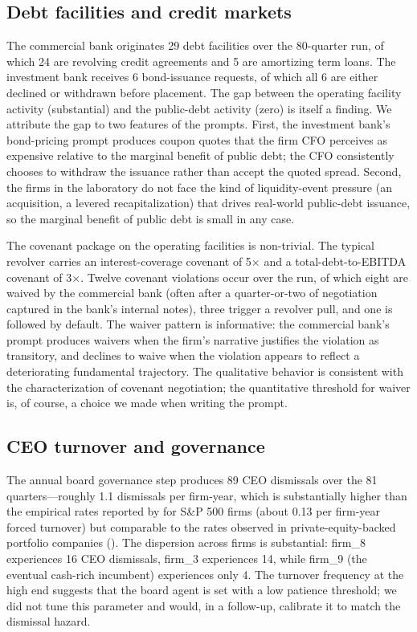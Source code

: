 \documentclass[11pt]{article}
\begin{document}
\subsection{Debt facilities and credit markets}

The commercial bank originates 29 debt facilities over the 80-quarter
run, of which 24 are revolving credit agreements and 5 are amortizing
term loans. The investment bank receives 6 bond-issuance requests, of
which all 6 are either declined or withdrawn before placement. The
gap between the operating facility activity (substantial) and the
public-debt activity (zero) is itself a finding. We attribute the
gap to two features of the prompts. First, the investment bank's
bond-pricing prompt produces coupon quotes that the firm CFO
perceives as expensive relative to the marginal benefit of public
debt; the CFO consistently chooses to withdraw the issuance rather
than accept the quoted spread. Second, the firms in the laboratory
do not face the kind of liquidity-event pressure (an acquisition, a
levered recapitalization) that drives real-world public-debt issuance,
so the marginal benefit of public debt is small in any case.

The covenant package on the operating facilities is non-trivial. The
typical revolver carries an interest-coverage covenant of 5$\times$
and a total-debt-to-EBITDA covenant of 3$\times$. Twelve covenant
violations occur over the run, of which eight are waived by the
commercial bank (often after a quarter-or-two of negotiation
captured in the bank's internal notes), three trigger a
revolver pull, and one is followed by default. The waiver pattern
is informative: the commercial bank's prompt produces waivers when
the firm's narrative justifies the violation as transitory, and
declines to waive when the violation appears to reflect a
deteriorating fundamental trajectory. The qualitative behavior is
consistent with the \citet{rauh2014capital} characterization of
covenant negotiation; the quantitative threshold for waiver is, of
course, a choice we made when writing the prompt.

\subsection{CEO turnover and governance}

The annual board governance step produces 89 CEO dismissals over the 81
quarters---roughly 1.1 dismissals per firm-year, which is substantially
higher than the empirical rates reported by \citet{kaplanminton2012} for
S\&P 500 firms (about 0.13 per firm-year forced turnover) but
comparable to the rates observed in private-equity-backed portfolio
companies (\citealp{cornelli2013ceo}). The dispersion across firms is
substantial: firm\_8 experiences 16 CEO dismissals, firm\_3 experiences
14, while firm\_9 (the eventual cash-rich incumbent) experiences only
4. The turnover frequency at the high end suggests that the board agent
is set with a low patience threshold; we did not tune this parameter
and would, in a follow-up, calibrate it to match the
\citet{taylor2010ceo} dismissal hazard.
\end{document}
